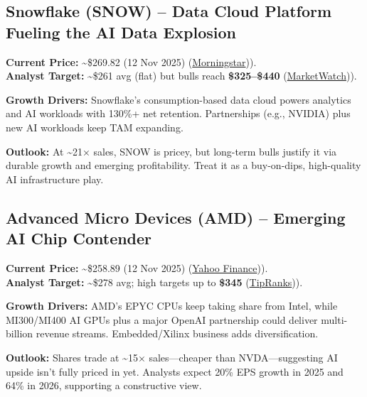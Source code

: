 \documentclass[
]{article}
\begin{document}
\hypertarget{snowflake-snow-data-cloud-platform-fueling-the-ai-data-explosion}{%
\subsection{Snowflake (SNOW) -- Data Cloud Platform Fueling the AI Data
Explosion}\label{snowflake-snow-data-cloud-platform-fueling-the-ai-data-explosion}}

\textbf{Current Price:} \textasciitilde\$269.82 (12 Nov 2025)
(\href{https://www.morningstar.com/stocks/xnys/snow/quote\#:~:text=Price}{Morningstar})).\\
\textbf{Analyst Target:} \textasciitilde\$261 avg (flat) but bulls reach
\textbf{\$325--\$440}
(\href{https://www.marketwatch.com/investing/stock/snow/analystestimates}{MarketWatch})).

\textbf{Growth Drivers:} Snowflake's consumption-based data cloud powers
analytics and AI workloads with 130\%+ net retention. Partnerships
(e.g., NVIDIA) plus new AI workloads keep TAM expanding.

\textbf{Outlook:} At \textasciitilde21× sales, SNOW is pricey, but
long-term bulls justify it via durable growth and emerging
profitability. Treat it as a buy-on-dips, high-quality AI infrastructure
play.

\hypertarget{advanced-micro-devices-amd-emerging-ai-chip-contender}{%
\subsection{Advanced Micro Devices (AMD) -- Emerging AI Chip
Contender}\label{advanced-micro-devices-amd-emerging-ai-chip-contender}}

\textbf{Current Price:} \textasciitilde\$258.89 (12 Nov 2025)
(\href{https://finance.yahoo.com/quote/AMD/history/\#:~:text=Data\%20finance,Nov\%2010\%2C\%202025}{Yahoo
Finance})).\\
\textbf{Analyst Target:} \textasciitilde\$278 avg; high targets up to
\textbf{\$345}
(\href{https://www.tipranks.com/stocks/amd/forecast\#:~:text=\%24278}{TipRanks})).

\textbf{Growth Drivers:} AMD's EPYC CPUs keep taking share from Intel,
while MI300/MI400 AI GPUs plus a major OpenAI partnership could deliver
multi-billion revenue streams. Embedded/Xilinx business adds
diversification.

\textbf{Outlook:} Shares trade at \textasciitilde15× sales---cheaper
than NVDA---suggesting AI upside isn't fully priced in yet. Analysts
expect 20\% EPS growth in 2025 and 64\% in 2026, supporting a
constructive view.
\end{document}
